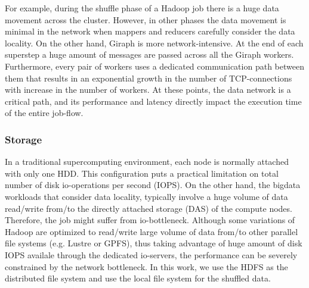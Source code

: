 \documentclass[conference]{IEEEtran}
\begin{document}
For example, during the shuffle phase of a Hadoop job there is a huge data movement across the cluster. However, in other phases the data movement is minimal in the network when mappers and reducers carefully consider the data locality. 
On the other hand,  Giraph is more network-intensive. 
At the end of each superstep a huge amount of messages are passed across all the Giraph workers. 
Furthermore, every pair of workers uses a dedicated communication path between them that results in an exponential growth in the number of TCP-connections with increase in the number of workers. 
At these points, the data network is a critical path, and its performance and latency directly impact the execution time of the entire job-flow.

\subsubsection {Storage}
In a traditional supercomputing environment, each node is normally attached with only one HDD. 
This configuration puts a practical limitation on total number of disk io-operations per second (IOPS). On the other hand, the bigdata workloads that consider data locality, typically involve a huge volume of data read/write from/to the directly attached storage (DAS) of the compute nodes. Therefore, the job might suffer from io-bottleneck.
Although some variations of Hadoop are optimized to read/write large volume of data from/to other parallel file systems (e.g. Lustre or GPFS), thus taking advantage of huge amount of disk IOPS availale through the dedicated io-servers, the performance can be severely constrained by the network bottleneck. %
In this work, we use the HDFS as the distributed file system and use the local file system for the shuffled data.
\end{document}
